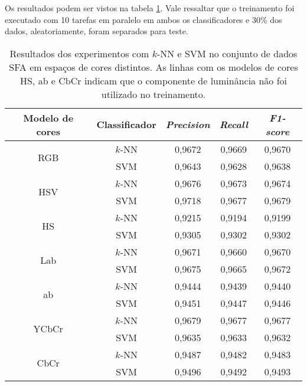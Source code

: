 Os resultados podem ser vistos na tabela \ref{tab:resultados_experimento_dois}. Vale ressaltar que o treinamento foi executado com 10 tarefas em paralelo em ambos os classificadores e 30\% dos dados, aleatoriamente, foram separados para teste.
\begin{table}[!htpb]
\centering
\begin{small}
\setlength{\tabcolsep}{8pt}

\begin{tabular}{|c|c|c|c|c|}\hline
 Modelo de cores & Classificador & \emph{Precision} & \emph{Recall} & \emph{F1-score} \\ \hline
 \multirow{2}{*}{RGB}   & $k$-NN  & 0,9672 & 0,9669 & 0,9670 \\ \cline{2-5}
                        & SVM     & 0,9643 & 0,9628 & 0,9638 \\ \hline
 \multirow{2}{*}{HSV}   & $k$-NN  & 0,9676 & 0,9673 & 0,9674 \\ \cline{2-5}
                        & SVM     & 0,9718 & 0,9677 & 0,9679 \\ \hline
 \multirow{2}{*}{HS}    & $k$-NN  & 0,9215 & 0,9194 & 0,9199 \\ \cline{2-5}
                        & SVM     & 0,9305 & 0,9302 & 0,9302 \\ \hline
 \multirow{2}{*}{Lab}   & $k$-NN  & 0,9671 & 0,9660 & 0,9670 \\ \cline{2-5}
                        & SVM     & 0,9675 & 0,9665 & 0,9672 \\ \hline
 \multirow{2}{*}{ab}    & $k$-NN  & 0,9444 & 0,9439 & 0,9440 \\ \cline{2-5}
                        & SVM     & 0,9451 & 0,9447 & 0,9446 \\ \hline
 \multirow{2}{*}{YCbCr} & $k$-NN  & 0,9679 & 0,9677 & 0,9677 \\ \cline{2-5}
                        & SVM     & 0,9635 & 0,9633 & 0,9632 \\ \hline
 \multirow{2}{*}{CbCr}  & $k$-NN  & 0,9487 & 0,9482 & 0,9483 \\ \cline{2-5}
                        & SVM     & 0,9496 & 0,9492 & 0,9493 \\ \hline

\end{tabular}
\end{small}
\caption[Resultados dos experimentos com $k$-NN e SVM no conjunto de dados SFA em espaços de cores distintos]{Resultados dos experimentos com $k$-NN e SVM no conjunto de dados SFA em espaços de cores distintos. As linhas com os modelos de cores HS, ab e CbCr indicam que o componente de luminância não foi utilizado no treinamento.}
\label{tab:resultados_experimento_dois}
\end{table}

